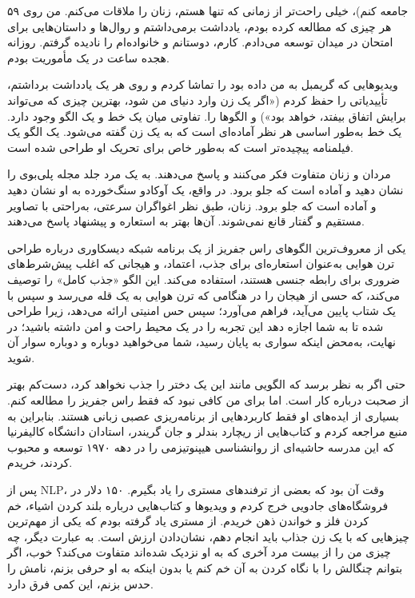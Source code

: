 ۵۹ جامعه کنم)، خیلی راحت‌تر از زمانی که تنها هستم، زنان را ملاقات می‌کنم. من روی هر چیزی که مطالعه کرده بودم، یادداشت برمی‌داشتم و روال‌ها و داستان‌هایی برای امتحان در میدان توسعه می‌دادم. کارم، دوستانم و خانواده‌ام را نادیده گرفتم. روزانه هجده ساعت در یک مأموریت بودم.

ویدیوهایی که گریمبل به من داده‌ بود را تماشا کردم و روی هر یک یادداشت برداشتم، تأییدیاتی را حفظ کردم («اگر یک زن وارد دنیای من شود، بهترین چیزی که می‌تواند برایش اتفاق بیفتد، خواهد بود») و الگوها را. تفاوتی میان یک خط و یک الگو وجود دارد. یک خط به‌طور اساسی هر نظر آماده‌ای است که به یک زن گفته می‌شود. یک الگو یک فیلمنامه پیچیده‌تر است که به‌طور خاص برای تحریک او طراحی شده است.

مردان و زنان متفاوت فکر می‌کنند و پاسخ می‌دهند. به یک مرد جلد مجله پلی‌بوی را نشان دهید و آماده است که جلو برود. در واقع، یک آوکادو سنگ‌خورده به او نشان دهید و آماده است که جلو برود. زنان، طبق نظر اغواگران سرعتی، به‌راحتی با تصاویر مستقیم و گفتار قانع نمی‌شوند. آن‌ها بهتر به استعاره و پیشنهاد پاسخ می‌دهند.

یکی از معروف‌ترین الگوهای راس جفریز از یک برنامه شبکه دیسکاوری درباره طراحی ترن هوایی به‌عنوان استعاره‌ای برای جذب، اعتماد، و هیجانی که اغلب پیش‌شرط‌های ضروری برای رابطه جنسی هستند، استفاده می‌کند. این الگو «جذب کامل» را توصیف می‌کند، که حسی از هیجان را در هنگامی که ترن هوایی به یک قله می‌رسد و سپس با یک شتاب پایین می‌آید، فراهم می‌آورد؛ سپس حس امنیتی ارائه می‌دهد، زیرا طراحی شده تا به شما اجازه دهد این تجربه را در یک محیط راحت و امن داشته باشید؛ در نهایت، به‌محض اینکه سواری به پایان رسید، شما می‌خواهید دوباره و دوباره سوار آن شوید.

حتی اگر به نظر برسد که الگویی مانند این یک دختر را جذب نخواهد کرد، دست‌کم بهتر از صحبت درباره کار است. اما برای من کافی نبود که فقط راس جفریز را مطالعه کنم. بسیاری از ایده‌های او فقط کاربردهایی از برنامه‌ریزی عصبی زبانی هستند. بنابراین به منبع مراجعه کردم و کتاب‌هایی از ریچارد بندلر و جان گریندر، استادان دانشگاه کالیفرنیا که این مدرسه حاشیه‌ای از روانشناسی هیپنوتیزمی را در دهه ۱۹۷۰ توسعه و محبوب کردند، خریدم.

پس از NLP، وقت آن بود که بعضی از ترفندهای مستری را یاد بگیرم. ۱۵۰ دلار در فروشگاه‌های جادویی خرج کردم و ویدیوها و کتاب‌هایی درباره بلند کردن اشیاء، خم کردن فلز و خواندن ذهن خریدم. از مستری یاد گرفته بودم که یکی از مهم‌ترین چیزهایی که با یک زن جذاب باید انجام دهم، نشان‌دادن ارزش است. به عبارت دیگر، چه چیزی من را از بیست مرد آخری که به او نزدیک شده‌اند متفاوت می‌کند؟ خوب، اگر بتوانم چنگالش را با نگاه کردن به آن خم کنم یا بدون اینکه به او حرفی بزنم، نامش را حدس بزنم، این کمی فرق دارد.

